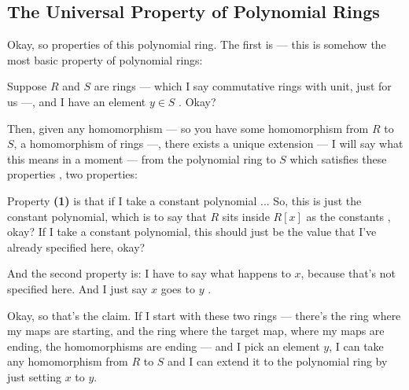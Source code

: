 \subsection{The Universal Property of Polynomial Rings}

\begin{speech}[00:06:30 - 00:09:00]
Okay, so properties of this polynomial ring. The first is --- this is somehow the most basic property of polynomial rings:

Suppose $R$ and $S$ are rings  --- which I say commutative rings with unit, just for us ---, and I have an element $y \in S$ . Okay?

Then, given any homomorphism  --- so you have some homomorphism from $R$ to $S$, a homomorphism of rings ---, there exists a unique extension  --- I will say what this means in a moment --- from the polynomial ring to $S$  which satisfies these properties , two properties:

Property \textbf{(1)} is that if I take a constant polynomial ... So, this is just the constant polynomial, which is to say that $R$ sits inside $R[x]$ as the constants , okay? If I take a constant polynomial, this should just be the value that I've already specified here, okay?

And the second property is: I have to say what happens to $x$, because that's not specified here. And I just say $x$ goes to $y$ .

Okay, so that's the claim. If I start with these two rings --- there's the ring where my maps are starting, and the ring where the target map, where my maps are ending, the homomorphisms are ending --- and I pick an element $y$, I can take any homomorphism from $R$ to $S$ and I can extend it to the polynomial ring by just setting $x$ to $y$.
\end{speech}


